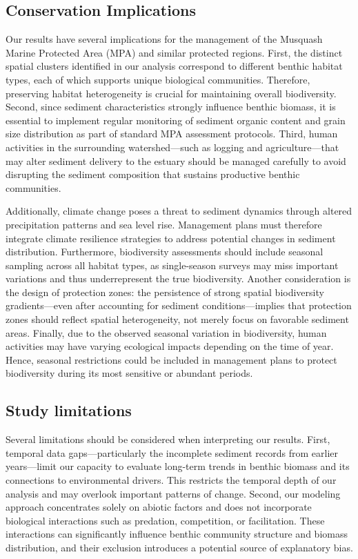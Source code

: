 \documentclass[12pt]{article}
\begin{document}
\subsection{Conservation Implications}

\qquad Our results have several implications for the management of the Musquash Marine Protected Area (MPA) and similar protected regions. First, the distinct spatial clusters identified in our analysis correspond to different benthic habitat types, each of which supports unique biological communities. Therefore, preserving habitat heterogeneity is crucial for maintaining overall biodiversity. Second, since sediment characteristics strongly influence benthic biomass, it is essential to implement regular monitoring of sediment organic content and grain size distribution as part of standard MPA assessment protocols. Third, human activities in the surrounding watershed—such as logging and agriculture—that may alter sediment delivery to the estuary should be managed carefully to avoid disrupting the sediment composition that sustains productive benthic communities.

\qquad Additionally, climate change poses a threat to sediment dynamics through altered precipitation patterns and sea level rise. Management plans must therefore integrate climate resilience strategies to address potential changes in sediment distribution. Furthermore, biodiversity assessments should include seasonal sampling across all habitat types, as single-season surveys may miss important variations and thus underrepresent the true biodiversity. Another consideration is the design of protection zones: the persistence of strong spatial biodiversity gradients—even after accounting for sediment conditions—implies that protection zones should reflect spatial heterogeneity, not merely focus on favorable sediment areas. Finally, due to the observed seasonal variation in biodiversity, human activities may have varying ecological impacts depending on the time of year. Hence, seasonal restrictions could be included in management plans to protect biodiversity during its most sensitive or abundant periods.

\subsection{Study limitations}

\qquad Several limitations should be considered when interpreting our results. First, temporal data gaps—particularly the incomplete sediment records from earlier years—limit our capacity to evaluate long-term trends in benthic biomass and its connections to environmental drivers. This restricts the temporal depth of our analysis and may overlook important patterns of change. Second, our modeling approach concentrates solely on abiotic factors and does not incorporate biological interactions such as predation, competition, or facilitation. These interactions can significantly influence benthic community structure and biomass distribution, and their exclusion introduces a potential source of explanatory bias.
\end{document}
